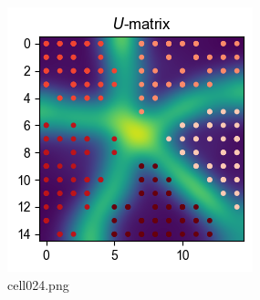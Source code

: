 \begin{figure}[ht]
	\centering
	\includegraphics[scale=0.8, max width=\linewidth]{./fig/local-learning-rule/self-organizing-map/cell024.png}
	\caption{cell024.png}
	\label{cell024.png}
\end{figure}